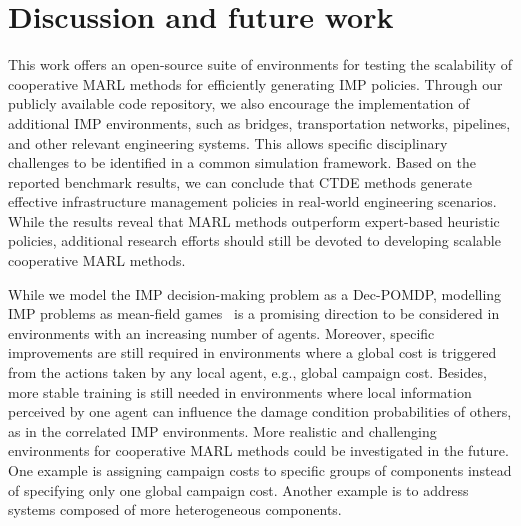 \section{Discussion and future work}\label{sec:ch5_discusconclu}
This work offers an open-source suite of environments for testing the scalability of cooperative MARL methods for efficiently generating IMP policies.
Through our publicly available code repository, we also encourage the implementation of additional IMP environments, such as bridges, transportation networks, pipelines, and other relevant engineering systems.
This allows specific disciplinary challenges to be identified in a common simulation framework.
Based on the reported benchmark results, we can conclude that CTDE methods generate effective infrastructure management policies in real-world engineering scenarios.
While the results reveal that MARL methods outperform expert-based heuristic policies, additional research efforts should still be devoted to developing scalable cooperative MARL methods.

While we model the IMP decision-making problem as a Dec-POMDP, modelling IMP problems as mean-field games~\citep{lauriere2022learning} is a promising direction to be considered in environments with an increasing number of agents.
Moreover, specific improvements are still required in environments where a global cost is triggered from the actions taken by any local agent, e.g., global campaign cost.
Besides, more stable training is still needed in environments where local information perceived by one agent can influence the damage condition probabilities of others, as in the correlated IMP environments.
More realistic and challenging environments for cooperative MARL methods could be investigated in the future.
One example is assigning campaign costs to specific groups of components instead of specifying only one global campaign cost.
Another example is to address systems composed of more heterogeneous components.